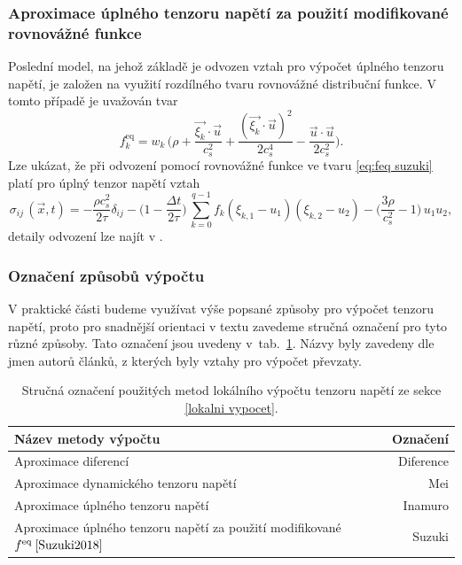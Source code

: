 \subsubsection*{\fontsize{11}{15}\selectfont Aproximace úplného tenzoru napětí za použití modifikované rovnovážné funkce}
Poslední model, na jehož základě je odvozen vztah pro výpočet úplného tenzoru napětí, je založen na využití rozdílného tvaru rovnovážné distribuční funkce. V tomto případě je uvažován tvar
\begin{equation}\label{eq:feq suzuki}
f^{\mathrm{eq}}_{k} = w_{k} \, \Bigg(\rho  + \frac{\vec{\xi_{k}} \cdot \vec{u}}{c^{2}_{s}} + \frac{(\vec{\xi_{k}} \cdot \vec{u})^2}{2c^{4}_{s}} - \frac{\vec{u} \cdot \vec{u}}{2c^{2}_{s}} \Bigg).
\end{equation}
Lze ukázat, že při odvození pomocí rovnovážné funkce ve tvaru \eqref{eq:feq suzuki} platí pro úplný tenzor napětí vztah
\begin{equation}\label{eq:suzuki}
\sigma_{ij} \, (\vec{x}, t) = - \frac{\rho c^{2}_{s}}{2 \tau} \delta_{ij} - \Bigg(1 - \frac{\Delta t}{2 \tau}\Bigg) \, \sum_{k=0}^{q-1}f_{k} ({\xi}_{k,1} - {u}_{1})({\xi}_{k,2} - {u}_{2}) - \Big(\frac{3\rho}{c^{2}_{s}} - 1\Big)\,{u}_{1}{u}_{2},
\end{equation}
detaily odvození lze najít v \cite{Suzuki2018}.

\subsubsection{\fontsize{11}{15}\selectfont Označení způsobů výpočtu}\label{oznaceni zpusobu}
V praktické části budeme využívat výše popsané způsoby pro výpočet tenzoru napětí, proto pro snadnější orientaci v textu zavedeme stručná označení pro tyto různé způsoby. Tato označení jsou uvedeny v~tab.~\ref{tab:names of local}. Názvy byly zavedeny dle jmen autorů článků, z kterých byly vztahy pro výpočet převzaty.

\begin{table}[H]
	\vspace{3mm}
	\centering
	\def\arraystretch{1.65}%
	\begin{tabularx}{0.815\textwidth}{l r}
		\hline
		Název metody výpočtu & Označení \\
		\hline
		Aproximace diferencí 			\		& Diference \\
		Aproximace dynamického tenzoru napětí \cite{NASA} 			\		& Mei \\
		Aproximace úplného tenzoru napětí \cite{Inamuro2000} 	\	& Inamuro \\
		Aproximace úplného tenzoru napětí za použití modifikované $ f^{\mathrm{eq}} \: \cite{Suzuki2018} $  \ & Suzuki \\
		\hline
	\end{tabularx}
	\vspace{5mm}
	\caption{Stručná označení použitých metod lokálního výpočtu tenzoru napětí ze sekce \ref{lokalni vypocet}.}
	\label{tab:names of local}
\end{table}
\vspace{1mm}

